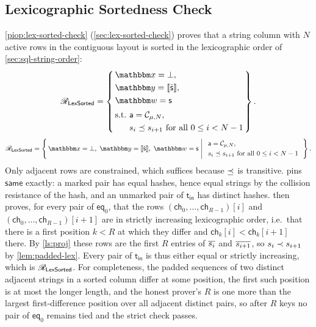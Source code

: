 \subsection{Lexicographic Sortedness Check}
\label{sec:proof-lexsorted}
\cref{piop:lex-sorted-check} (\cref{sec:lex-sorted-check}) proves that a string column with $N$ active rows in the contiguous layout is sorted in the lexicographic order of \cref{sec:sql-string-order}:
\ifsp
\begin{displaymath}
\NPRelation_{\mathsf{LexSorted}} = \left\{\,
  \begin{aligned}
    & \NPInstance = \bot,\\
    & \NPInstancey = \Oracle{\hat{\strcol}},\\
    & \NPWitness = \strcol\\[2pt]
    & \text{s.t.}\ \mathsf{a} = \contig_{\mu,N},\\
    & \phantom{\text{s.t.}}\ s_i \lexle s_{i+1}\ \text{for all } 0 \le i < N-1
  \end{aligned}
\,\right\}.
\end{displaymath}
\else
\begin{displaymath}
\NPRelation_{\mathsf{LexSorted}} = \left\{\,
  \NPInstance = \bot,\;
  \NPInstancey = \Oracle{\hat{\strcol}},\;
  \NPWitness = \strcol
  \;\middle|\;
  \begin{array}{l}
    \mathsf{a} = \contig_{\mu,N}, \\[3pt]
    s_i \lexle s_{i+1}\ \text{for all } 0 \le i < N-1
  \end{array}
\,\right\}.
\end{displaymath}
\fi
Only adjacent rows are constrained, which suffices because $\preceq$ is transitive.
 pins $\mathsf{same}$ exactly: a marked pair has equal hashes, hence equal strings by the collision resistance of the hash, and an unmarked pair of $\mathsf{t}_{\mathsf{in}}$ has distinct hashes.  then proves, for every pair of $\mathsf{eq}_0$, that the rows $(\mathsf{ch}_0, \dots, \mathsf{ch}_{R-1})[i]$ and $(\mathsf{ch}_0, \dots, \mathsf{ch}_{R-1})[i+1]$ are in strictly increasing lexicographic order, i.e.\ that there is a first position $k < R$ at which they differ and $\mathsf{ch}_k[i] < \mathsf{ch}_k[i+1]$ there. By \cref{ls:proj} these rows are the first $R$ entries of $\overline{s_i}$ and $\overline{s_{i+1}}$, so $s_i \prec s_{i+1}$ by \cref{lem:padded-lex}. Every pair of $\mathsf{t}_{\mathsf{in}}$ is thus either equal or strictly increasing, which is $\mathscr{R}_{\mathsf{LexSorted}}$. For completeness, the padded sequences of two distinct adjacent strings in a sorted column differ at some position, the first such position is at most the longer length, and the honest prover's $R$ is one more than the largest first-difference position over all adjacent distinct pairs, so after $R$ keys no pair of $\mathsf{eq}_0$ remains tied and the strict check passes.

